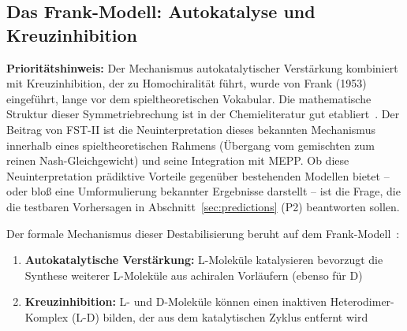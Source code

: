 \documentclass[12pt,a4paper]{article}
\theoremstyle{remark}
\begin{document}
\subsection{Das Frank-Modell: Autokatalyse und Kreuzinhibition}

\textbf{Prioritätshinweis:} Der Mechanismus autokatalytischer Verstärkung kombiniert mit Kreuzinhibition, der zu Homochiralität führt, wurde von Frank (1953)~\citep{Frank1953} eingeführt, lange vor dem spieltheoretischen Vokabular. Die mathematische Struktur dieser Symmetriebrechung ist in der Chemieliteratur gut etabliert~\citep{PlassonReview2007}. Der Beitrag von FST-II ist die Neuinterpretation dieses bekannten Mechanismus innerhalb eines spieltheoretischen Rahmens (Übergang vom gemischten zum reinen Nash-Gleichgewicht) und seine Integration mit MEPP. Ob diese Neuinterpretation prädiktive Vorteile gegenüber bestehenden Modellen bietet -- oder bloß eine Umformulierung bekannter Ergebnisse darstellt -- ist die Frage, die die testbaren Vorhersagen in Abschnitt~\ref{sec:predictions} (P2) beantworten sollen.

Der formale Mechanismus dieser Destabilisierung beruht auf dem Frank-Modell~\citep{Frank1953}:
\begin{enumerate}
    \item \textbf{Autokatalytische Verstärkung:} L-Moleküle katalysieren bevorzugt die Synthese weiterer L-Moleküle aus achiralen Vorläufern (ebenso für D)
    \item \textbf{Kreuzinhibition:} L- und D-Moleküle können einen inaktiven Heterodimer-Komplex (L-D) bilden, der aus dem katalytischen Zyklus entfernt wird~\citep{Biochirality}
\end{enumerate}
\end{document}
